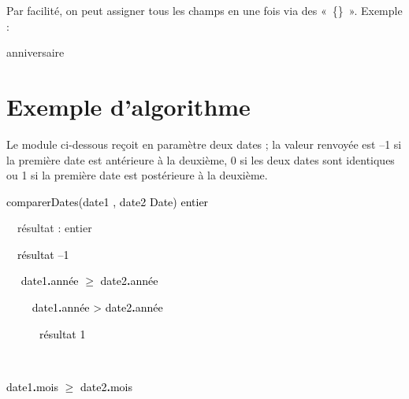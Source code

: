 {
}

{
Par facilité, on peut assigner tous les champs en une fois via des
«~\{\}~». Exemple :}

{\sffamily
anniversaire
\textstyleMotCl{{\textcolor{black}{←
}}}}

\section{Exemple d’algorithme}
{
Le module ci-dessous reçoit en paramètre deux dates ; la valeur renvoyée
est –1 si la première date est antérieure à la deuxième, 0 si les deux
dates sont identiques ou 1 si la première date est postérieure à la
deuxième.}

{\sffamily
\textstyleMotCl{\textcolor{black}{module}}\textcolor{black}{
comparerDates(date1
}\textstylePolicepardfaut{{\textsf{\textcolor{black}{↓}}}}\textcolor{black}{,
date2
}\textstylePolicepardfaut{{\textsf{\textcolor{black}{↓
:}}}}\textcolor{black}{ Date}\textcolor{black}{)
}\textstylePolicepardfaut{{\textsf{\textcolor{black}{→}}}}\textcolor{black}{
entier}}

{\sffamily
\ \ résultat : entier }

{\sffamily
\textcolor{black}{\ \ résultat
}\textstyleMotCl{{\textcolor{black}{←}}}\textcolor{black}{
–1}}

{\sffamily
\textcolor{black}{\ \ }\textstyleMotCl{\textcolor{black}{si}}\textcolor{black}{
date1}\textbf{\textcolor{black}{.}}\textcolor{black}{année
}\textrm{\textcolor{black}{${\geq}$}}\textcolor{black}{
date2}\textbf{\textcolor{black}{.}}\textcolor{black}{année
}\textstyleMotCl{\textcolor{black}{alors}}}

{\sffamily
\textcolor{black}{\ \ \ \ }\textstyleMotCl{\textcolor{black}{si}}\textcolor{black}{
date1}\textbf{\textcolor{black}{.}}\textcolor{black}{année
{\textgreater}
date2}\textbf{\textcolor{black}{.}}\textcolor{black}{année
}\textstyleMotCl{\textcolor{black}{alors}}}

{\sffamily
\textcolor{black}{\ \ \ \ \ \ résultat
}\textstyleMotCl{{\textcolor{black}{←}}}\textcolor{black}{
1}}

{\sffamily
\ \ \ \ }

{\sffamily
\textstyleMotCl{\textcolor{black}{\ \ \ \ \ \ si}}\textcolor{black}{
date1}\textbf{\textcolor{black}{.}}\textcolor{black}{mois
}\textrm{\textcolor{black}{${\geq}$}}\textcolor{black}{
date2}\textbf{\textcolor{black}{.}}\textcolor{black}{mois
}\textstyleMotCl{\textcolor{black}{alors}}}

